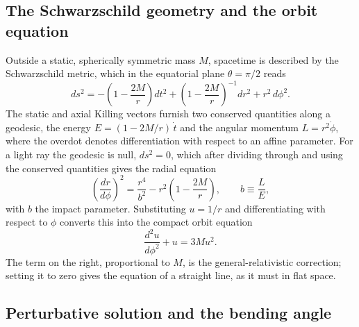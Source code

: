 \documentclass[10pt]{article}
\theoremstyle{definition}
\theoremstyle{remark}
\begin{document}
\subsection{The Schwarzschild geometry and the orbit equation}

Outside a static, spherically symmetric mass $M$, spacetime is described by the Schwarzschild metric, which in the equatorial plane $\theta = \pi/2$ reads
\begin{equation}
ds^2 = -\left(1 - \frac{2M}{r}\right)dt^2 + \left(1 - \frac{2M}{r}\right)^{-1}dr^2 + r^2\,d\phi^2.
\end{equation}
The static and axial Killing vectors furnish two conserved quantities along a geodesic, the energy $E = (1-2M/r)\,\dot t$ and the angular momentum $L = r^2\dot\phi$, where the overdot denotes differentiation with respect to an affine parameter. For a light ray the geodesic is null, $ds^2 = 0$, which after dividing through and using the conserved quantities gives the radial equation
\begin{equation}
\left(\frac{dr}{d\phi}\right)^{\!2} = \frac{r^4}{b^2} - r^2\left(1 - \frac{2M}{r}\right), \qquad b \equiv \frac{L}{E},
\end{equation}
with $b$ the impact parameter. Substituting $u = 1/r$ and differentiating with respect to $\phi$ converts this into the compact orbit equation
\begin{equation}\label{eq:orbit}
\frac{d^2 u}{d\phi^2} + u = 3M u^2 .
\end{equation}
The term on the right, proportional to $M$, is the general-relativistic correction; setting it to zero gives the equation of a straight line, as it must in flat space.

\subsection{Perturbative solution and the bending angle}
\end{document}
